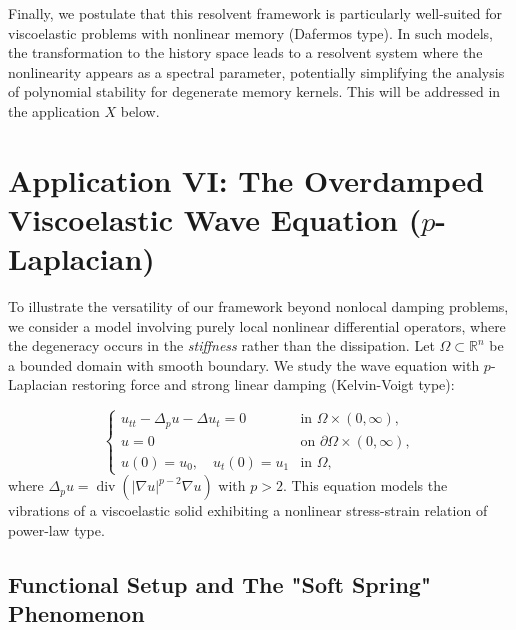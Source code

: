 \documentclass[11pt,reqno]{amsart}
\theoremstyle{remark}
\begin{document}
Finally, we postulate that this resolvent framework is particularly well-suited for viscoelastic problems with nonlinear memory (Dafermos type). In such models, the transformation to the history space leads to a resolvent system where the nonlinearity appears as a spectral parameter, potentially simplifying the analysis of polynomial stability for degenerate memory kernels. This will be addressed in the application $X$ below.




\section{Application VI: The Overdamped Viscoelastic Wave Equation ($p$-Laplacian)}
\label{sec:p_laplacian}

To illustrate the versatility of our framework beyond nonlocal damping problems, we consider a model involving purely local nonlinear differential operators, where the degeneracy occurs in the \textit{stiffness} rather than the dissipation. Let $\Omega \subset \mathbb{R}^n$ be a bounded domain with smooth boundary. We study the wave equation with $p$-Laplacian restoring force and strong linear damping (Kelvin-Voigt type):

\begin{equation} \label{eq:p_laplacian_wave}
\begin{cases}
u_{tt} - \Delta_p u - \Delta u_t = 0 & \text{in } \Omega \times (0, \infty), \\
u = 0 & \text{on } \partial\Omega \times (0, \infty), \\
u(0) = u_0, \quad u_t(0) = u_1 & \text{in } \Omega,
\end{cases}
\end{equation}
where $\Delta_p u = \operatorname{div}(|\nabla u|^{p-2}\nabla u)$ with $p > 2$. This equation models the vibrations of a viscoelastic solid exhibiting a nonlinear stress-strain relation of power-law type.

\subsection{Functional Setup and The "Soft Spring" Phenomenon}
\end{document}
